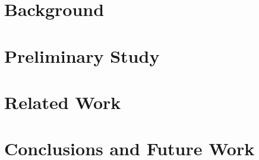 \documentclass[conference]{IEEEtran}
\begin{document}
\section{Background}\label{background}


\section{Preliminary Study}\label{study}


\section{Related Work}\label{related}


\section{Conclusions and Future Work}\label{conlusion}





\end{document}
